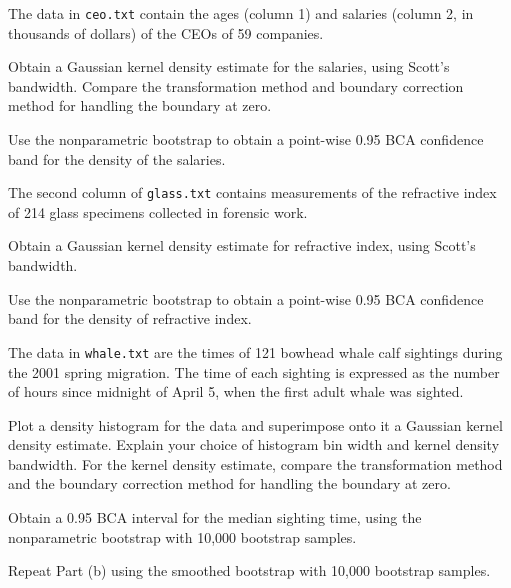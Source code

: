 \begin{exercise}
The data in {\tt ceo.txt} contain the ages (column 1) and salaries (column 2, in thousands of dollars) of the CEOs of 59 companies.
\begin{asparaenum}[(a)]
\item Obtain a Gaussian kernel density estimate for the salaries, using Scott's bandwidth. Compare the transformation method and boundary correction method for handling the boundary at zero.

\item Use the nonparametric bootstrap to obtain a point-wise 0.95 BCA confidence band for the density of the salaries.

\end{asparaenum}
\end{exercise}

\begin{exercise}
The second column of {\tt glass.txt} contains measurements of the refractive index of 214 glass specimens collected in forensic work.
\begin{asparaenum}[(a)]
\item Obtain a Gaussian kernel density estimate for refractive index, using Scott's bandwidth.

\item Use the nonparametric bootstrap to obtain a point-wise 0.95 BCA confidence band for the density of refractive index.
\end{asparaenum}

\end{exercise}

\begin{exercise}
The data in {\tt whale.txt} are the times of 121 bowhead whale calf sightings during the 2001 spring migration. The time of each sighting is expressed as the number of hours since midnight of April 5, when the first adult whale was sighted.
\begin{asparaenum}[(a)]
\item Plot a density histogram for the data and superimpose onto it a Gaussian kernel density estimate. Explain your choice of histogram bin width and kernel density bandwidth. For the kernel density estimate, compare the transformation method and the boundary correction method for handling the boundary at zero.

\item Obtain a 0.95 BCA interval for the median sighting time, using the nonparametric bootstrap with 10,000 bootstrap samples.

\item Repeat Part (b) using the smoothed bootstrap with 10,000 bootstrap samples.
\end{asparaenum}

\end{exercise}

